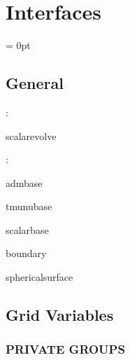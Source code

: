 
\section{Interfaces} 


\parskip = 0pt

\vspace{3mm} \subsection*{General}

: 

scalarevolve
\vspace{2mm}

: 

admbase

tmunubase

scalarbase

boundary

sphericalsurface
\vspace{2mm}
\subsection*{Grid Variables}
\vspace{5mm}\subsubsection{PRIVATE GROUPS}

\vspace{5mm}

